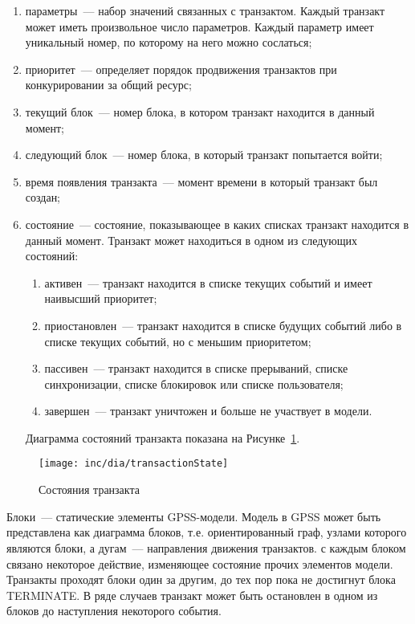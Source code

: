 \begin{enumerate}
\item параметры~--- набор значений связанных с транзактом. Каждый транзакт может иметь произвольное число параметров. Каждый параметр имеет уникальный номер, по которому на него можно сослаться;
\item приоритет~--- определяет порядок продвижения транзактов при конкурировании за общий ресурс;
\item текущий блок~--- номер блока, в котором транзакт находится в данный момент;
\item следующий блок~--- номер блока, в который транзакт попытается войти;
\item время появления транзакта~---  момент времени в который транзакт был создан;
\item состояние~--- состояние, показывающее в каких списках транзакт находится в данный момент. Транзакт может находиться в одном из следующих состояний:
    \begin{enumerate}
    \item активен~--- транзакт находится в списке текущих событий и имеет наивысший приоритет;
    \item приостановлен~--- транзакт находится в списке будущих событий либо в списке текущих событий, но с меньшим приоритетом;
    \item пассивен~--- транзакт находится в списке прерываний, списке синхронизации, списке блокировок или списке пользователя;
    \item завершен~--- транзакт уничтожен и больше не участвует в модели.
    \end{enumerate}
    Диаграмма состояний транзакта показана на Рисунке~\ref{fig:transactionState}.
\end{enumerate}


\begin{figure}[ht]
  \centering
  \texttt{[image: inc/dia/transactionState]}
  \caption{Состояния транзакта}
  \label{fig:transactionState}
\end{figure}


Блоки~--- статические элементы GPSS-модели. Модель в GPSS может быть представлена как диаграмма блоков, т.е. ориентированный граф, узлами которого являются блоки, а дугам~--- направления движения транзактов. с каждым блоком связано некоторое действие, изменяющее состояние прочих элементов модели. Транзакты проходят блоки один за другим, до тех пор пока не достигнут блока TERMINATE. В ряде случаев транзакт может быть остановлен в одном из блоков до наступления некоторого события.


